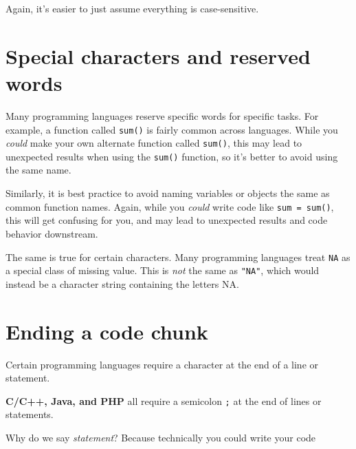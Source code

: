 \documentclass[
]{book}
\begin{document}
Again, it's easier to just assume everything is case-sensitive.

\section{Special characters and reserved words}\label{special-characters-and-reserved-words}

Many programming languages reserve specific words for specific tasks.
For example, a function called \texttt{sum()} is fairly common across
languages. While you \emph{could} make your own alternate function called
\texttt{sum()}, this may lead to unexpected results when using the \texttt{sum()}
function, so it's better to avoid using the same name.

Similarly, it is best practice to avoid naming variables or objects the
same as common function names. Again, while you \emph{could} write code like
\texttt{sum\ =\ sum()}, this will get confusing for you, and may lead to
unexpected results and code behavior downstream.

The same is true for certain characters. Many programming languages
treat \texttt{NA} as a special class of missing value. This is \emph{not} the same
as \texttt{"NA"}, which would instead be a character string containing the
letters NA.

\section{Ending a code chunk}\label{ending-a-code-chunk}

Certain programming languages require a character at the end of a line or statement.

\textbf{C/C++, Java, and PHP} all require a semicolon \texttt{;} at the end of lines or statements.

Why do we say \emph{statement}? Because technically you could write your code
\end{document}
